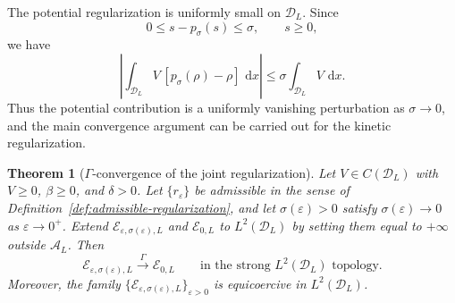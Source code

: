 \documentclass[11pt]{article}
\newcommand{\A}{\mathcal{A}}
\newcommand{\E}{\mathcal{E}}
\newcommand{\dd}{\,\mathrm{d}}
\newcommand{\eps}{\varepsilon}
\newcommand{\sig}{\sigma}
\theoremstyle{plain}
\newtheorem{theorem}{Theorem}[section]
\theoremstyle{definition}
\numberwithin{equation}{section}
\begin{document}
The potential regularization is uniformly small on $\mathcal D_L$. Since
\begin{equation}
\label{eq:potential-energy-defect}
0\le s-p_\sig(s)\le\sig,
\qquad s\ge0,
\end{equation}
we have
\[
\left|
\int_{\mathcal D_L}
V\,[p_\sig(\rho)-\rho]\,\dd x
\right|
\le
\sig\int_{\mathcal D_L}V\,\dd x.
\]
Thus the potential contribution is a uniformly vanishing perturbation
as $\sig\to0$, and the main convergence argument can be carried out
for the kinetic regularization.

\begin{theorem}[$\Gamma$-convergence of the joint regularization]
\label{thm:gamma-joint}
Let $V\in C(\mathcal D_L)$ with $V\ge0$, $\beta\ge0$, and $\delta>0$.
Let $\{r_\eps\}$ be admissible in the sense of
Definition~\ref{def:admissible-regularization}, and let
$\sig(\eps)>0$ satisfy
$\sig(\eps)\to0$ as $\eps\to0^+$.
Extend $\E_{\eps,\sig(\eps),L}$ and $\E_{0,L}$ to $L^2(\mathcal D_L)$
by setting them equal to $+\infty$ outside $\A_L$.
Then
\[
\E_{\eps,\sig(\eps),L}
\xrightarrow{\Gamma}
\E_{0,L}
\qquad
\text{in the strong }L^2(\mathcal D_L)\text{ topology}.
\]
Moreover, the family
$\{\E_{\eps,\sig(\eps),L}\}_{\eps>0}$
is equicoercive in $L^2(\mathcal D_L)$.
\end{theorem}
\end{document}
